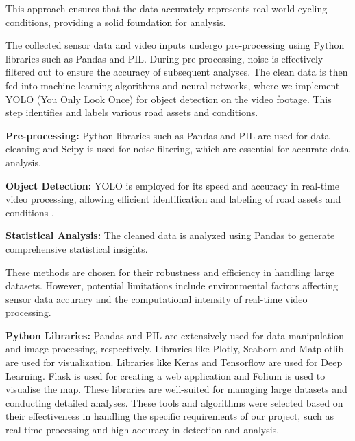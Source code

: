 \documentclass[a4paper,12pt]{Classes/RoboticsLaTeX}
\begin{document}
\begin{abstracts}
This approach ensures that the data accurately represents real-world cycling conditions, providing a solid foundation for analysis.

The collected sensor data and video inputs undergo pre-processing using Python libraries such as Pandas and PIL. During pre-processing, noise is effectively filtered out to ensure the accuracy of subsequent analyses. The clean data is then fed into machine learning algorithms and neural networks, where we implement YOLO (You Only Look Once) for object detection \cite{Pham} on the video footage. This step identifies and labels various road assets and conditions.

\textbf{Pre-processing:} Python libraries such as Pandas and PIL are used for data cleaning and Scipy is used for noise filtering, which are essential for accurate data analysis.

\vspace{10pt}

\textbf{Object Detection:} YOLO is employed for its speed and accuracy in real-time video processing, allowing efficient identification and labeling of road assets and conditions \cite{Dewi}.

\vspace{10pt}

\textbf{Statistical Analysis:} The cleaned data is analyzed using Pandas to generate comprehensive statistical insights. 

\vspace{10pt}

These methods are chosen for their robustness and efficiency in handling large datasets. However, potential limitations include environmental factors affecting sensor data accuracy and the computational intensity of real-time video processing.

\vspace{10pt}

\textbf{Python Libraries:} Pandas and PIL are extensively used for data manipulation and image processing, respectively. Libraries like Plotly, Seaborn and Matplotlib are used for visualization. Libraries like Keras and Tensorflow are used for Deep Learning. Flask is used for creating a web application and Folium is used to visualise the map. These libraries are well-suited for managing large datasets and conducting detailed analyses.
These tools and algorithms were selected based on their effectiveness in handling the specific requirements of our project, such as real-time processing and high accuracy in detection and analysis.


\end{abstracts}
\end{document}
